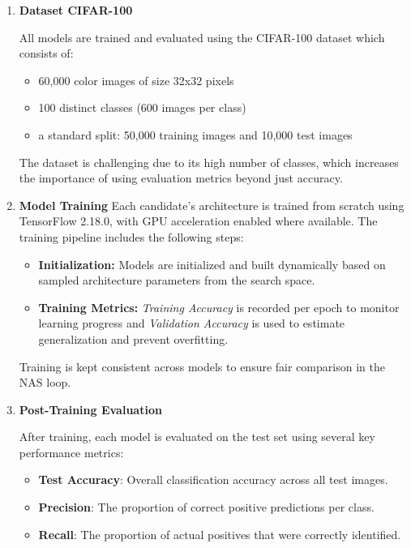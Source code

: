 \begin{enumerate}

    \item \textbf{Dataset CIFAR-100}
    
    All models are trained and evaluated using the CIFAR-100 dataset which consists of:
\begin{itemize}
    \item 60,000 color images of size 32x32 pixels
    \item 100 distinct classes (600 images per class)
\item a standard split: 50,000 training images and 10,000 test images

\end{itemize}

The dataset is challenging due to its high number of classes, which increases the importance of using evaluation metrics beyond just accuracy.

    \item \textbf{Model Training}
    Each candidate's architecture is trained from scratch using TensorFlow 2.18.0, with GPU acceleration enabled where available. The training pipeline includes the following steps:
    
\begin{itemize}
    \item \textbf{Initialization:} Models are initialized and built dynamically based on sampled architecture parameters from the search space.
    \item \textbf{Training Metrics:} \textit{Training Accuracy} is recorded per epoch to monitor learning progress and \textit{Validation Accuracy} is used to estimate generalization and prevent overfitting.

\end{itemize}

Training is kept consistent across models to ensure fair comparison in the NAS loop.
\item \textbf{Post-Training Evaluation}

After training, each model is evaluated on the test set using several key performance metrics: 
\begin{itemize}
    \item \textbf{Test Accuracy}: Overall classification accuracy across all test images.
    \item \textbf{Precision}: The proportion of correct positive predictions per class.
    \item \textbf{Recall}: The proportion of actual positives that were correctly identified.
\end{itemize}


\end{enumerate}
